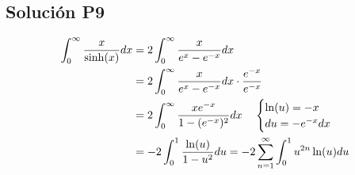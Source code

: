 \begin{CajaTitulo}{\begin{center}\subsection{Solución P9}\end{center}}
    \vspace{0.5cm}
    \begin{align*}
        \int_{0}^{\infty} \frac{x}{\sinh(x)}dx &= 2\int_{0}^{\infty} \frac{x}{e^x - e^{-x}}dx\\
        &= 2\int_{0}^{\infty} \frac{x}{e^x - e^{-x}}dx\cdot \frac{e^{-x}}{e^{-x}}\\
        &= 2\int_{0}^{\infty} \frac{xe^{-x}}{1 - (e^{-x})^2}dx \: \hspace{0.3cm}\begin{cases} \ln(u) = -x \\ du = -e^{-x}dx \end{cases}\\
        &= -2\int_{0}^{1} \frac{\ln(u)}{1 - u^2}du = -2\sum_{n=1}^{\infty}\int_{0}^{1}u^{2n}\ln(u)du\\
    \end{align*}
\end{CajaTitulo}